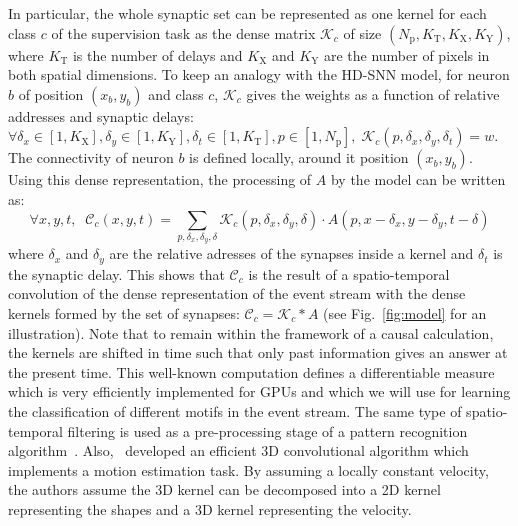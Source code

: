 \documentclass[default]{sn-jnl}%
\theoremstyle{thmstyleone}%
\theoremstyle{thmstyletwo}%
\theoremstyle{thmstylethree}%
\newcommand{\seeFig}[1]{see Fig.~\ref{fig:#1}}%
\newcommand{\postsynaddr}{b} %
\newcommand{\Npol}{N_\text{p}} %
\newcommand{\synapticweight}{w} %
\newcommand{\synapticdelay}{\delta} %
\newcommand{\timev}{t} %
\newcommand{\polev}{p} %
\newcommand{\kernel}{\mathcal{K}} %
\newcommand{\Kx}{K_\text{X}}
\newcommand{\Ky}{K_\text{Y}}
\newcommand{\Ktime}{K_\text{T}}
\newcommand{\class}{c} %
\begin{document}
In particular, the whole synaptic set can be represented as one kernel for each class $\class$ of the supervision task as the dense matrix $\kernel_\class$ of size $(\Npol, \Ktime, \Kx, \Ky)$, where  $\Ktime$ is the number of delays and $\Kx$ and $\Ky$ are the number of pixels in both spatial dimensions. To keep an analogy with the HD-SNN model, for neuron $\postsynaddr$ of position $(x_\postsynaddr, y_\postsynaddr)$ and class $\class$, $\kernel_\class$ gives the weights as a function of relative addresses and synaptic delays: $\forall {\delta_x \in [1, \Kx], \delta_y \in [1, \Ky], \delta_\timev \in [1, \Ktime], \polev \in [1, \Npol]}, \; \kernel_\class(\polev, \delta_x, \delta_y, \synapticdelay_\timev) = \synapticweight$. The connectivity of neuron $\postsynaddr$ is defined locally, around it position $(x_\postsynaddr, y_\postsynaddr)$. %
Using this dense representation, the processing of $A$ by the model can be written as:
%
\begin{equation}\label{eq:kernel_b}
\forall x, y, \timev, \; \;
\mathcal{C}_\class(x, y, \timev)
= \sum_{p, \delta_x, \delta_y, \synapticdelay} \kernel_\class(p, \delta_x, \delta_y, \synapticdelay) \cdot A(p, x - \delta_x, y - \delta_y, \timev-\synapticdelay)
\end{equation}
%
where $\delta_x$ and $\delta_y$ are the relative adresses of the synapses inside a kernel and $\delta_\timev$ is the synaptic delay. 
This shows that $\mathcal{C}_\class$ is the result of a spatio-temporal convolution of the dense representation of the event stream with the dense kernels formed by the set of synapses:  $\mathcal{C}_\class = \kernel_\class \ast A$ (\seeFig{model} for an illustration). Note that to remain within the framework of a causal calculation, the kernels are shifted in time such that only past information gives an answer at the present time. This well-known computation defines a differentiable measure which is very efficiently implemented for GPUs and which we will use for learning the classification of different motifs in the event stream. The same type of spatio-temporal filtering is used as a pre-processing stage of a pattern recognition algorithm~\citep{ghosh_spatiotemporal_2019}. Also,~\citet{sekikawa_constant_2018} developed an efficient 3D convolutional algorithm which implements a motion estimation task. By assuming a locally constant velocity, the authors assume the 3D kernel can be decomposed into a 2D kernel representing the shapes and a 3D kernel representing the velocity. 
\end{document}
